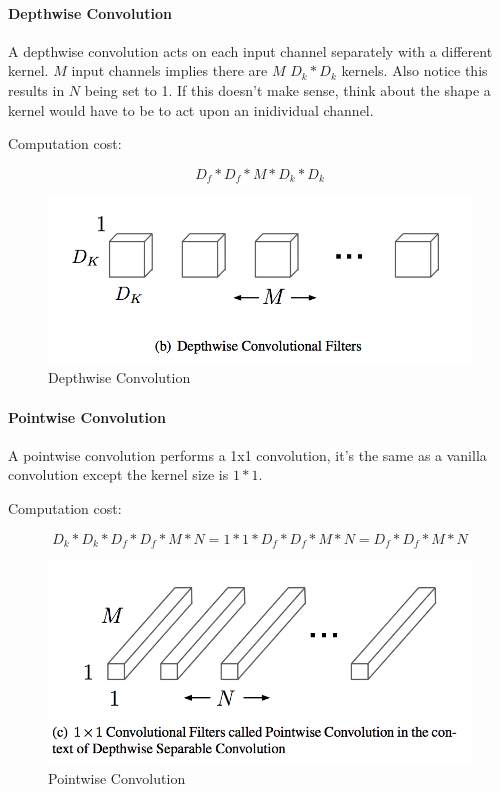 \documentclass[11pt]{article}
\makeatletter
\def\maxwidth{\ifdim\Gin@nat@width>\linewidth\linewidth
    \else\Gin@nat@width\fi}
\let\Oldincludegraphics\includegraphics
\renewcommand{\includegraphics}[1]{\Oldincludegraphics[width=.8\maxwidth]{#1}}
\makeatother
\begin{document}
\hypertarget{depthwise-convolution}{%
\paragraph{Depthwise Convolution}\label{depthwise-convolution}}

A depthwise convolution acts on each input channel separately with a
different kernel. \(M\) input channels implies there are \(M\)
\(D_k * D_k\) kernels. Also notice this results in \(N\) being set to 1.
If this doesn't make sense, think about the shape a kernel would have to
be to act upon an inidividual channel.

Computation cost:

\[
D_f * D_f * M * D_k * D_k
\]

\begin{figure}
\centering
\includegraphics{assets/depthwise_conv.png}
\caption{Depthwise Convolution}
\end{figure}

\hypertarget{pointwise-convolution}{%
\paragraph{Pointwise Convolution}\label{pointwise-convolution}}

A pointwise convolution performs a 1x1 convolution, it's the same as a
vanilla convolution except the kernel size is \(1 * 1\).

Computation cost:

\[
D_k * D_k * D_f * D_f * M * N =
1 * 1 * D_f * D_f * M * N =
D_f * D_f * M * N
\]

\begin{figure}
\centering
\includegraphics{assets/pointwise_conv.png}
\caption{Pointwise Convolution}
\end{figure}
\end{document}
